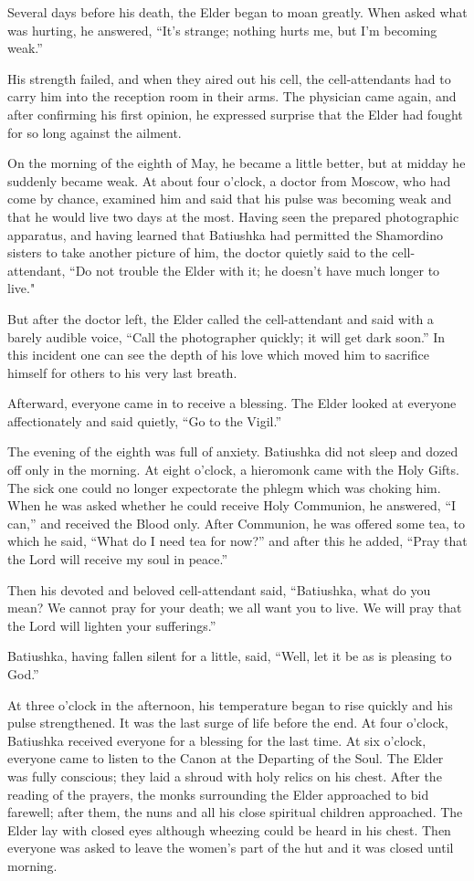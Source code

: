 Several days before his death, the Elder began to moan greatly. When asked what was hurting, he answered, “It's strange; nothing hurts me, but I'm becoming weak.”

His strength failed, and when they aired out his cell, the cell-attendants had to carry him into the reception room in their arms. The physician came again, and after confirming his first opinion, he expressed surprise that the Elder had fought for so long against the ailment.

On the morning of the eighth of May, he became a little better, but at midday he suddenly became weak. At about four o'clock, a doctor from Moscow, who had come by chance, examined him and said that his pulse was becoming weak and that he would live two days at the most. Having seen the prepared photographic apparatus, and having learned that Batiushka had permitted the Shamordino sisters to take another picture of him, the doctor quietly said to the cell-attendant, “Do not trouble the Elder with it; he doesn't have much longer to live."

But after the doctor left, the Elder called the cell-attendant and said with a barely audible voice, “Call the photographer quickly; it will get dark soon.” In this incident one can see the depth of his love which moved him to sacrifice himself for others to his very last breath.

Afterward, everyone came in to receive a blessing. The Elder looked at everyone affectionately and said quietly, “Go to the Vigil.”

The evening of the eighth was full of anxiety. Batiushka did not sleep and dozed off only in the morning. At eight o'clock, a hieromonk came with the Holy Gifts. The sick one could no longer expectorate the phlegm which was choking him. When he was asked whether he could receive Holy Communion, he answered, “I can,” and received the Blood only. After Communion, he was offered some tea, to which he said, “What do I need tea for now?” and after this he added, “Pray that the Lord will receive my soul in peace.”

Then his devoted and beloved cell-attendant said, “Batiushka, what do you mean? We cannot pray for your death; we all want you to live. We will pray that the Lord will lighten your sufferings.”

Batiushka, having fallen silent for a little, said, “Well, let it be as is pleasing to God.”

At three o'clock in the afternoon, his temperature began to rise quickly and his pulse strengthened. It was the last surge of life before the end. At four o'clock, Batiushka received everyone for a blessing for the last time. At six o'clock, everyone came to listen to the Canon at the Departing of the Soul. The Elder was fully conscious; they laid a shroud with holy relics on his chest. After the reading of the prayers, the monks surrounding the Elder approached to bid farewell; after them, the nuns and all his close spiritual children approached. The Elder lay with closed eyes although wheezing could be heard in his chest. Then everyone was asked to leave the women's part of the hut and it was closed until morning.

